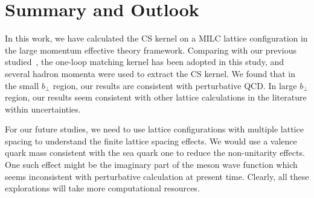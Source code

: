 \section{Summary and Outlook}
\label{sec:summary}

In this work, we have calculated the CS kernel on a MILC lattice configuration in the large momentum effective theory framework. Comparing with our previous studied~\cite{LatticeParton:2020uhz}, the one-loop matching kernel has been adopted in this study, and several hadron momenta were used to extract the CS kernel. We found that in the small $b_{\perp}$ region, our results are consistent with perturbative QCD. 
In large $b_{\perp}$ region, our results seem consistent with other lattice calculations in the literature within uncertainties. 

For our future studies, we need to
use lattice configurations with multiple lattice spacing to understand the finite
lattice spacing effects. We would
use a valence quark mass consistent with the sea quark one to reduce the non-unitarity effects. One such effect 
might be the imaginary part of the meson
wave function which seems inconsistent
with perturbative calculation at present time. Clearly, all these explorations will
take more computational resources. 
